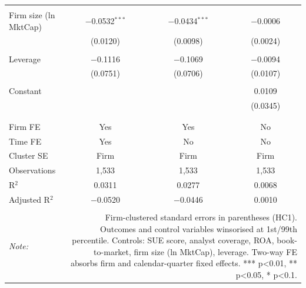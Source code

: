 \begin{table}[!htbp]
\begin{tabular}{@{\extracolsep{5pt}}lccc}
  & & & \\ 
 Firm size (ln MktCap) & $-$0.0532$^{***}$ & $-$0.0434$^{***}$ & $-$0.0006 \\ 
  & (0.0120) & (0.0098) & (0.0024) \\ 
  & & & \\ 
 Leverage & $-$0.1116 & $-$0.1069 & $-$0.0094 \\ 
  & (0.0751) & (0.0706) & (0.0107) \\ 
  & & & \\ 
 Constant &  &  & 0.0109 \\ 
  &  &  & (0.0345) \\ 
  & & & \\ 
\hline \\[-1.8ex] 
Firm FE & Yes & Yes & No \\ 
Time FE & Yes & No & No \\ 
Cluster SE & Firm & Firm & Firm \\ 
Observations & 1,533 & 1,533 & 1,533 \\ 
R$^{2}$ & 0.0311 & 0.0277 & 0.0068 \\ 
Adjusted R$^{2}$ & $-$0.0520 & $-$0.0446 & 0.0010 \\ 
\hline 
\hline \\[-1.8ex] 
\textit{Note:}  & \multicolumn{3}{r}{Firm-clustered standard errors in parentheses (HC1). Outcomes and control variables winsorised at 1st/99th percentile. Controls: SUE score, analyst coverage, ROA, book-to-market, firm size (ln MktCap), leverage. Two-way FE absorbs firm and calendar-quarter fixed effects. *** p<0.01, ** p<0.05, * p<0.1.} \\ 
\end{tabular} 
\end{table} 
